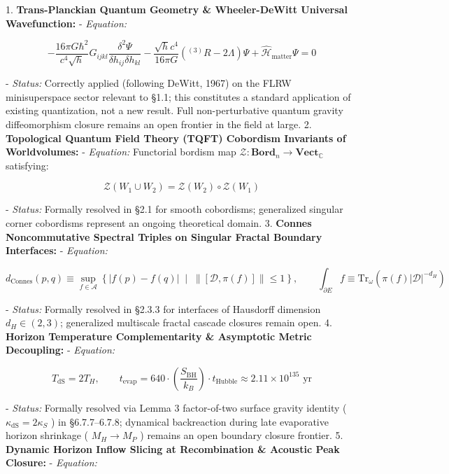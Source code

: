 \documentclass[11pt,a4paper]{article}
\theoremstyle{definition}
\theoremstyle{remark}
\begin{document}
1. \textbf{Trans-Planckian Quantum Geometry \& Wheeler-DeWitt Universal Wavefunction:}
- \textit{Equation:}


\begin{equation}
-\frac{16\pi G\hbar^2}{c^4\sqrt{h}} G_{ijkl} \frac{\delta^2 \Psi}{\delta h_{ij} \delta h_{kl}} - \frac{\sqrt{h} c^4}{16\pi G} ({}^{(3)}R - 2\Lambda) \Psi + \hat{\mathcal{H}}_{\text{matter}} \Psi = 0
\end{equation}


- \textit{Status:} Correctly applied (following DeWitt, 1967) on the FLRW minisuperspace sector relevant to \S 1.1; this constitutes a standard application of existing quantization, not a new result. Full non-perturbative quantum gravity diffeomorphism closure remains an open frontier in the field at large.
2. \textbf{Topological Quantum Field Theory (TQFT) Cobordism Invariants of Worldvolumes:}
- \textit{Equation:} Functorial bordism map $\mathcal{Z}: \mathbf{Bord}_n \to \mathbf{Vect}_{\mathbb{C}}$ satisfying:


\begin{equation}
\mathcal{Z}(W_1 \cup W_2) = \mathcal{Z}(W_2) \circ \mathcal{Z}(W_1)
\end{equation}


- \textit{Status:} Formally resolved in \S 2.1 for smooth cobordisms; generalized singular corner cobordisms represent an ongoing theoretical domain.
3. \textbf{Connes Noncommutative Spectral Triples on Singular Fractal Boundary Interfaces:}
- \textit{Equation:}


\begin{equation}
d_{\text{Connes}}(p, q) \equiv \sup_{f \in \mathcal{A}} \left\{ |f(p) - f(q)| \;\middle|\; \|[\mathcal{D}, \pi(f)]\| \le 1 \right\}, \qquad \int_{\partial E} f \equiv \mathrm{Tr}_\omega\left(\pi(f)|\mathcal{D}|^{-d_H}\right)
\end{equation}


- \textit{Status:} Formally resolved in \S 2.3.3 for interfaces of Hausdorff dimension $d_H \in (2, 3)$; generalized multiscale fractal cascade closures remain open.
4. \textbf{Horizon Temperature Complementarity \& Asymptotic Metric Decoupling:}
- \textit{Equation:}


\begin{equation}
T_{\text{dS}} = 2 T_H, \qquad t_{\text{evap}} = 640 \cdot \left(\frac{S_{\text{BH}}}{k_B}\right) \cdot t_{\text{Hubble}} \approx 2.11 \times 10^{135} \text{ yr}
\end{equation}


- \textit{Status:} Formally resolved via Lemma 3 factor-of-two surface gravity identity ( $\kappa_{\text{dS}} = 2\kappa_S$ ) in \S 6.7.7–6.7.8; dynamical backreaction during late evaporative horizon shrinkage ( $M_H \to M_P$ ) remains an open boundary closure frontier.
5. \textbf{Dynamic Horizon Inflow Slicing at Recombination \& Acoustic Peak Closure:}
- \textit{Equation:}
\end{document}
